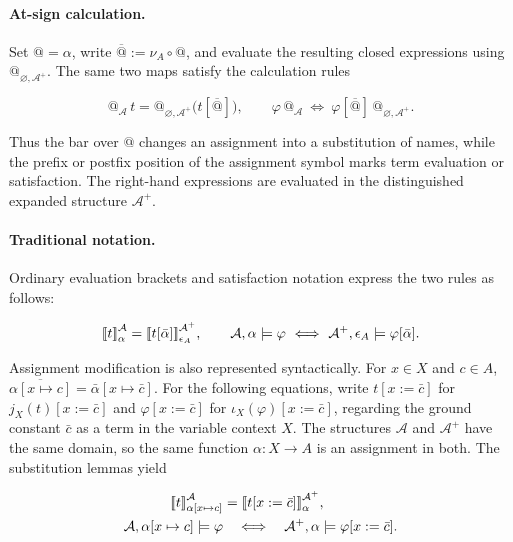 \documentclass[11pt]{article}
\makeatletter
\newcommand{\llbracket}{\mathopen{[\mkern-3mu[}}
\newcommand{\rrbracket}{\mathclose{]\mkern-3mu]}}
\newcommand{\atsign}{\mathord{@}}
\makeatother
\begin{document}
\paragraph{At-sign calculation.}
Set \(\atsign=\alpha\), write
\(\overline{\atsign}:=\nu_A\circ\atsign\), and evaluate the resulting
closed expressions using \(\atsign_{\varnothing,\mathcal A^+}\). The same two maps
satisfy the calculation rules

\[
\boxed{
\atsign_{\mathcal A}\,t
=\atsign_{\varnothing,\mathcal A^+}\bigl(t[\overline{\atsign}]\bigr),
\qquad
\varphi\,\atsign_{\mathcal A}
\ \Longleftrightarrow\ 
\varphi[\overline{\atsign}]\,\atsign_{\varnothing,\mathcal A^+}.
}
\]

Thus the bar over \(\atsign\) changes an assignment into a substitution of
names, while the prefix or postfix position of the assignment symbol marks
term evaluation or satisfaction. The right-hand expressions are evaluated in
the distinguished expanded structure \(\mathcal A^+\).

\paragraph{Traditional notation.}
Ordinary evaluation brackets and satisfaction notation express the two rules
as follows:

\[
\llbracket t\rrbracket^{\mathcal A}_\alpha
=\llbracket t[\bar\alpha]\rrbracket^{\mathcal A^+}_{\epsilon_A},
\qquad
\mathcal A,\alpha\models\varphi
\ \Longleftrightarrow\ 
\mathcal A^+,\epsilon_A\models\varphi[\bar\alpha].
\]

Assignment modification is also represented syntactically. For \(x\in X\) and
\(c\in A\),
\(\overline{\alpha[x\mapsto c]}=\bar\alpha[x\mapsto\bar c]\). For the
following equations, write \(t[x:=\bar c]\) for \(j_X(t)[x:=\bar c]\) and
\(\varphi[x:=\bar c]\) for \(\iota_X(\varphi)[x:=\bar c]\), regarding the
ground constant \(\bar c\) as a term in the variable context \(X\). The
structures \(\mathcal A\) and \(\mathcal A^+\) have the same domain, so the
same function \(\alpha:X\to A\) is an assignment in both. The substitution
lemmas yield

\[
\begin{aligned}
\llbracket t\rrbracket^{\mathcal A}_{\alpha[x\mapsto c]}
&=\llbracket t[x:=\bar c]\rrbracket^{\mathcal A^+}_\alpha,\\
\mathcal A,\alpha[x\mapsto c]\models\varphi
&\quad\Longleftrightarrow\quad
\mathcal A^+,\alpha\models\varphi[x:=\bar c].
\end{aligned}
\]
\end{document}
